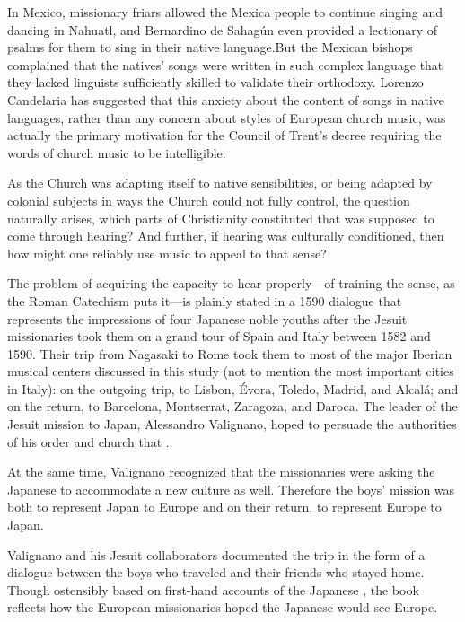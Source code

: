 In Mexico, missionary friars allowed the Mexica people to continue singing and dancing in Nahuatl, and Bernardino de Sahagún even provided a lectionary of psalms for them to sing in their native language.\citXXX[Candelaria]
But the Mexican bishops\XXX{} complained that the natives' songs were written in such complex language that they lacked linguists sufficiently skilled to validate their orthodoxy.\citXXX{}
Lorenzo Candelaria has suggested that this anxiety about the content of songs in native languages, rather than any concern about styles of European church music, was actually the primary motivation for the Council of Trent's decree requiring the words of church music to be intelligible.

As the Church was adapting itself to native sensibilities, or being adapted by colonial subjects in ways the Church could not fully control, the question naturally arises, which parts of Christianity constituted  that was supposed to come through hearing?
And further, if hearing was culturally conditioned, then how might one reliably use music to appeal to that sense?

The problem of acquiring the capacity to hear properly---of training the sense, as the Roman Catechism puts it---is plainly stated in a 1590 dialogue that represents the impressions of four Japanese noble youths after the Jesuit missionaries took them on a grand tour of Spain and Italy between 1582 and 1590.%
  \autocite{Sande:DeMissioneLegatorum}
Their trip from Nagasaki to Rome took them to most of the major Iberian musical centers discussed in this study (not to mention the most important cities in Italy): on the outgoing trip, to Lisbon, Évora, Toledo, Madrid, and Alcalá; and on the return, to Barcelona, Montserrat, Zaragoza, and Daroca.
The leader of the Jesuit mission to Japan, Alessandro Valignano, hoped to persuade the authorities of his order and church that .%
  \autocite[4]{Massarella:JapaneseTravellers}

At the same time, Valignano recognized that the missionaries were asking the Japanese to accommodate a new culture as well. 
Therefore the boys' mission was both to represent Japan to Europe and on their return, to represent Europe to Japan.

Valignano and his Jesuit collaborators documented the trip in the form of a dialogue between the boys who traveled and their friends who stayed home.
Though ostensibly based on first-hand accounts of the Japanese , the book reflects how the European missionaries hoped the Japanese would see Europe.

